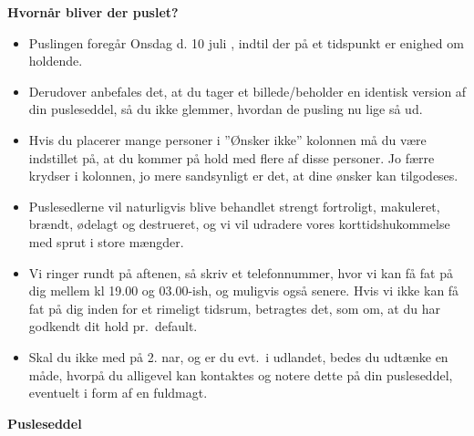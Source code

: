 \documentclass[10pt,a4paper,letterpaper]{article}
\begin{document}
{\large{\textbf{Hvornår bliver der puslet?}}}\\
\begin{itemize}
    \item Puslingen foregår Onsdag d. 10 juli \the\year, indtil der på et
      tidspunkt er enighed om holdende.
    \item Derudover anbefales det, at du tager et billede/beholder en identisk
      version af din pusleseddel, så du ikke glemmer, hvordan de pusling nu
      lige så ud.
    \item Hvis du placerer mange personer i ”Ønsker ikke” kolonnen må du være
      indstillet på, at du kommer på hold med flere af disse personer. Jo færre
      krydser i kolonnen, jo mere sandsynligt er det, at dine ønsker kan
      tilgodeses.
    \item Puslesedlerne vil naturligvis blive behandlet strengt fortroligt,
      makuleret, brændt, ødelagt og destrueret, og vi vil udradere vores
      korttidshukommelse med sprut i store mængder.
    \item Vi ringer rundt på aftenen, så skriv et telefonnummer, hvor vi kan få
      fat på dig mellem kl 19.00 og 03.00-ish, og muligvis også senere. Hvis vi
      ikke kan få fat på dig inden for et rimeligt tidsrum, betragtes det, som
      om, at du har godkendt dit hold pr.\ default.
    \item Skal du ikke med på 2. nar, og er du evt.\ i udlandet, bedes du udtænke
      en måde, hvorpå du alligevel kan kontaktes og notere dette på din
      pusleseddel, eventuelt i form af en fuldmagt.
\end{itemize}

\newpage
\setcounter{page}{1}
{\large{\textbf{Pusleseddel \the\year}}}\\

\\

\\

 \\
\end{document}
